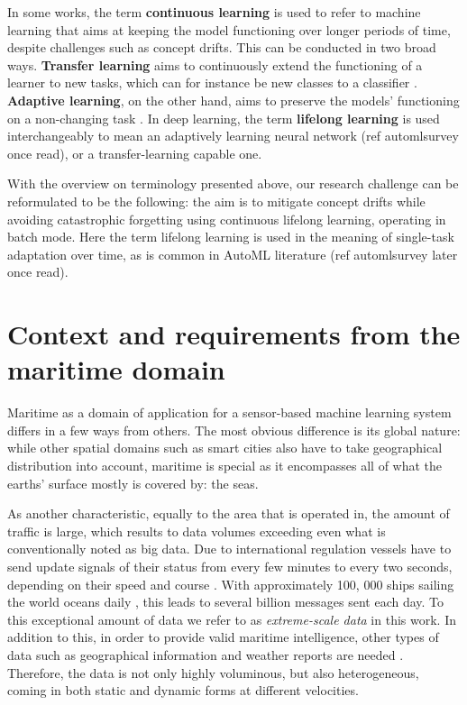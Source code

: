 In some works, the term \textbf{continuous learning} is used to refer to machine learning that aims at keeping the model functioning over longer periods of time, despite challenges such as concept drifts. This can be conducted in two broad ways. \textbf{Transfer learning} aims to continuously extend the functioning of a learner to new tasks, which can for instance be new classes to a classifier \cite{iotsurvey}. \textbf{Adaptive learning}, on the other hand, aims to preserve the models' functioning on a non-changing task \cite{conceptdriftsurvey}. In deep learning, the term \textbf{lifelong learning} is used interchangeably to mean an adaptively learning neural network (ref automlsurvey once read), or a transfer-learning capable one.

With the overview on terminology presented above, our research challenge can be reformulated to be the following: the aim is to mitigate concept drifts while avoiding catastrophic forgetting using continuous lifelong learning, operating in batch mode. Here the term lifelong learning is used in the meaning of single-task adaptation over time, as is common in AutoML literature (ref automlsurvey later once read).


\section{Context and requirements from the maritime domain}

Maritime as a domain of application for a sensor-based machine learning system differs in a few ways from others. The most obvious difference is its global nature: while other spatial domains such as smart cities also have to take geographical distribution into account, maritime is special as it encompasses all of what the earths' surface mostly is covered by: the seas. 

As another characteristic, equally to the area that is operated in, the amount of traffic is large, which results to data volumes exceeding even what is conventionally noted as big data. Due to international regulation vessels have to send update signals of their status from every few minutes to every two seconds, depending on their speed and course \cite{maritimeinformatics}. With approximately 100, 000 ships sailing the world oceans daily \cite{maritimeinformatics}, this leads to several billion messages sent each day. To this exceptional amount of data we refer to as \textit{extreme-scale data} in this work. In addition to this, in order to provide valid maritime intelligence, other types of data such as geographical information and weather reports are needed \cite{D1.1}. Therefore, the data is not only highly voluminous, but also heterogeneous, coming in both static and dynamic forms at different velocities.

